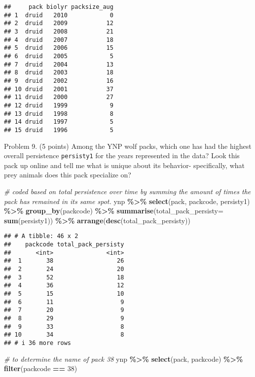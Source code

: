 \documentclass[
]{article}
\newenvironment{Shaded}{\begin{snugshade}}{\end{snugshade}}
\newcommand{\AttributeTok}[1]{\textcolor[rgb]{0.13,0.29,0.53}{#1}}
\newcommand{\CommentTok}[1]{\textcolor[rgb]{0.56,0.35,0.01}{\textit{#1}}}
\newcommand{\DecValTok}[1]{\textcolor[rgb]{0.00,0.00,0.81}{#1}}
\newcommand{\FunctionTok}[1]{\textcolor[rgb]{0.13,0.29,0.53}{\textbf{#1}}}
\newcommand{\NormalTok}[1]{#1}
\newcommand{\SpecialCharTok}[1]{\textcolor[rgb]{0.81,0.36,0.00}{\textbf{#1}}}
\begin{document}
\begin{verbatim}
##     pack biolyr packsize_aug
## 1  druid   2010            0
## 2  druid   2009           12
## 3  druid   2008           21
## 4  druid   2007           18
## 5  druid   2006           15
## 6  druid   2005            5
## 7  druid   2004           13
## 8  druid   2003           18
## 9  druid   2002           16
## 10 druid   2001           37
## 11 druid   2000           27
## 12 druid   1999            9
## 13 druid   1998            8
## 14 druid   1997            5
## 15 druid   1996            5
\end{verbatim}

Problem 9. (5 points) Among the YNP wolf packs, which one has had the
highest overall persistence \texttt{persisty1} for the years represented
in the data? Look this pack up online and tell me what is unique about
its behavior- specifically, what prey animals does this pack specialize
on?

\begin{Shaded}
\begin{Highlighting}[]
\CommentTok{\# coded based on total persistence over time by summing the amount of times the pack has remained in it\textquotesingle{}s same spot.}
\NormalTok{ynp }\SpecialCharTok{\%\textgreater{}\%}
  \FunctionTok{select}\NormalTok{(pack, packcode, persisty1) }\SpecialCharTok{\%\textgreater{}\%}
  \FunctionTok{group\_by}\NormalTok{(packcode) }\SpecialCharTok{\%\textgreater{}\%}
  \FunctionTok{summarise}\NormalTok{(}\AttributeTok{total\_pack\_persisty=} \FunctionTok{sum}\NormalTok{(persisty1)) }\SpecialCharTok{\%\textgreater{}\%}
  \FunctionTok{arrange}\NormalTok{(}\FunctionTok{desc}\NormalTok{(total\_pack\_persisty))}
\end{Highlighting}
\end{Shaded}

\begin{verbatim}
## # A tibble: 46 x 2
##    packcode total_pack_persisty
##       <int>               <int>
##  1       38                  26
##  2       24                  20
##  3       52                  18
##  4       36                  12
##  5       15                  10
##  6       11                   9
##  7       20                   9
##  8       29                   9
##  9       33                   8
## 10       34                   8
## # i 36 more rows
\end{verbatim}

\begin{Shaded}
\begin{Highlighting}[]
\CommentTok{\# to determine the name of pack 38}
\NormalTok{ynp }\SpecialCharTok{\%\textgreater{}\%}
  \FunctionTok{select}\NormalTok{(pack, packcode) }\SpecialCharTok{\%\textgreater{}\%}
  \FunctionTok{filter}\NormalTok{(packcode }\SpecialCharTok{==} \DecValTok{38}\NormalTok{)}
\end{Highlighting}
\end{Shaded}
\end{document}
